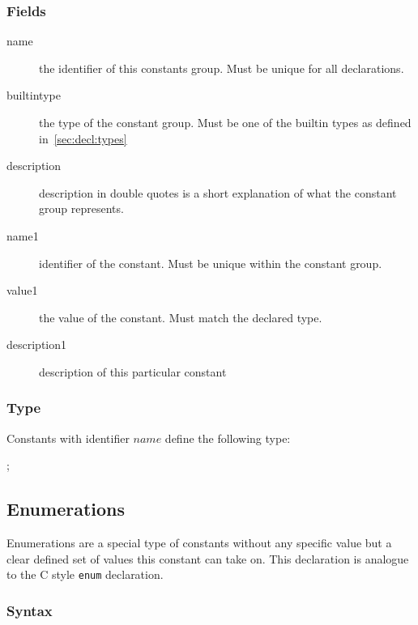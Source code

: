 \documentclass[a4paper,11pt,twoside]{report}
\begin{document}
{{\subsubsection{Fields}

\begin{description}
    \item[name] the identifier of this constants group. Must be unique for all 
                declarations.
    
    \item [builtintype] the type of the constant group. Must be one of the 
                        builtin types as defined in~\ref{sec:decl:types}
    
    \item [description] description in double quotes is a short explanation of
                        what the constant group represents.
    
    \item [name1] identifier of the constant. Must be unique within the 
                  constant group. 
    
    \item [value1] the value of the constant. Must match the declared type.
    
    \item [description1] description of this particular constant
    
\end{description}

\subsubsection{Type}
Constants with identifier $name$ define the following type:
\begin{syntax}
 ;
\end{syntax}


\subsection{Enumerations}
\label{sec:decl:enums}

Enumerations are a special type of constants without any specific value but a 
clear defined set of values this constant can take on. This
declaration is analogue to the C style \texttt{enum} declaration.

\subsubsection{Syntax}

}}
\end{document}
